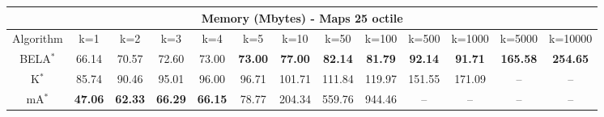 \begin{tabular}{c|cccccccccccc}\toprule
\multicolumn{13}{c}{Memory (Mbytes) - Maps 25 octile}\\ \midrule
Algorithm & k=1 & k=2 & k=3 & k=4 & k=5 & k=10 & k=50 & k=100 & k=500 & k=1000 & k=5000 & k=10000 \\ \midrule
BELA$^*$ & 66.14 & 70.57 & 72.60 & 73.00 & \textbf{73.00} & \textbf{77.00} & \textbf{82.14} & \textbf{81.79} & \textbf{92.14} & \textbf{91.71} & \textbf{165.58} & \textbf{254.65} \\
K$^*$ & 85.74 & 90.46 & 95.01 & 96.00 & 96.71 & 101.71 & 111.84 & 119.97 & 151.55 & 171.09 & -- & -- \\
mA$^*$ & \textbf{47.06} & \textbf{62.33} & \textbf{66.29} & \textbf{66.15} & 78.77 & 204.34 & 559.76 & 944.46 & -- & -- & -- & -- \\ \bottomrule 
\end{tabular}
